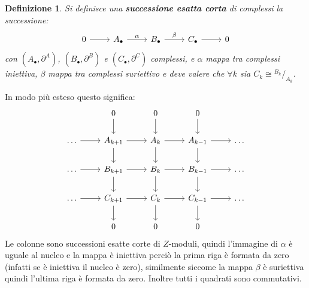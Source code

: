 \documentclass[10pt, twoside=false, x11names]{scrbook}
\newtheorem{definition}[theorem]{Definizione}
\newcommand*\quot[2]{{^{\textstyle #1}\big/_{\textstyle #2}}}
\begin{document}
\begin{definition}
  Si definisce una \textbf{successione esatta corta} di
  complessi la successione:
  \[
    \begin{tikzcd}
      0 \arrow{r}{} & A_\bullet \arrow{r}{\alpha} & B_\bullet \arrow{r}{\beta} & C_\bullet \arrow{r}{} & 0
    \end{tikzcd}
  \]
  con $ (A_\bullet, \partial^A) $, $ (B_\bullet, \partial^B) $ e $ (C_\bullet, \partial^C) $ complessi, e
  $ \alpha $ mappa tra complessi iniettiva, $ \beta $ mappa tra complessi suriettivo
  e deve valere che $ \forall k $ sia $ C_k \cong \quot{B_k}{A_k} $.
\end{definition}


In modo più esteso questo significa:
\[
  \begin{tikzcd}
    {} & 0 \arrow{d}{} & 0 \arrow{d}{} & 0 \arrow{d}{} & {} \\
    \dots \arrow{r}{} & A_{k+1} \arrow{r}{} \arrow{d}{} & A_{k} \arrow{r}{} \arrow{d}{} & A_{k-1} \arrow{r}{} \arrow{d}{} & \dots \\
    \dots \arrow{r}{} & B_{k+1} \arrow{r}{} \arrow{d}{} & B_{k} \arrow{r}{} \arrow{d}{} & B_{k-1} \arrow{r}{} \arrow{d}{} & \dots \\
    \dots \arrow{r}{} & C_{k+1} \arrow{r}{} \arrow{d}{} & C_{k} \arrow{r}{} \arrow{d}{} & C_{k-1} \arrow{r}{} \arrow{d}{} & \dots \\
    {} & 0 & 0 & 0 & {}
  \end{tikzcd}
\]
Le colonne sono successioni esatte corte di $ Z $-moduli, quindi
l'immagine di $ \alpha $ è uguale al nucleo e la mappa è iniettiva
perciò la prima riga è formata da zero (infatti se è
iniettiva il nucleo è zero), similmente siccome
la mappa $ \beta $ è suriettiva quindi l'ultima
riga è formata da zero.
Inoltre tutti i quadrati sono commutativi.
\end{document}

